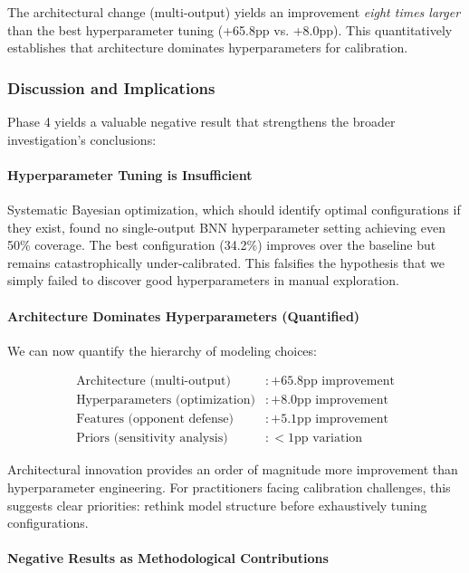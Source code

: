 The architectural change (multi-output) yields an improvement \textit{eight times larger} than the best hyperparameter tuning (+65.8pp vs. +8.0pp). This quantitatively establishes that architecture dominates hyperparameters for calibration.

\subsubsection{Discussion and Implications}

Phase 4 yields a valuable negative result that strengthens the broader investigation's conclusions:

\paragraph{Hyperparameter Tuning is Insufficient}

Systematic Bayesian optimization, which should identify optimal configurations if they exist, found no single-output BNN hyperparameter setting achieving even 50\% coverage. The best configuration (34.2\%) improves over the baseline but remains catastrophically under-calibrated. This falsifies the hypothesis that we simply failed to discover good hyperparameters in manual exploration.

\paragraph{Architecture Dominates Hyperparameters (Quantified)}

We can now quantify the hierarchy of modeling choices:

\begin{align}
    \text{Architecture (multi-output)} &: +65.8\text{pp improvement} \\
    \text{Hyperparameters (optimization)} &: +8.0\text{pp improvement} \\
    \text{Features (opponent defense)} &: +5.1\text{pp improvement} \\
    \text{Priors (sensitivity analysis)} &: <1\text{pp variation}
\end{align}

Architectural innovation provides an order of magnitude more improvement than hyperparameter engineering. For practitioners facing calibration challenges, this suggests clear priorities: rethink model structure before exhaustively tuning configurations.

\paragraph{Negative Results as Methodological Contributions}

